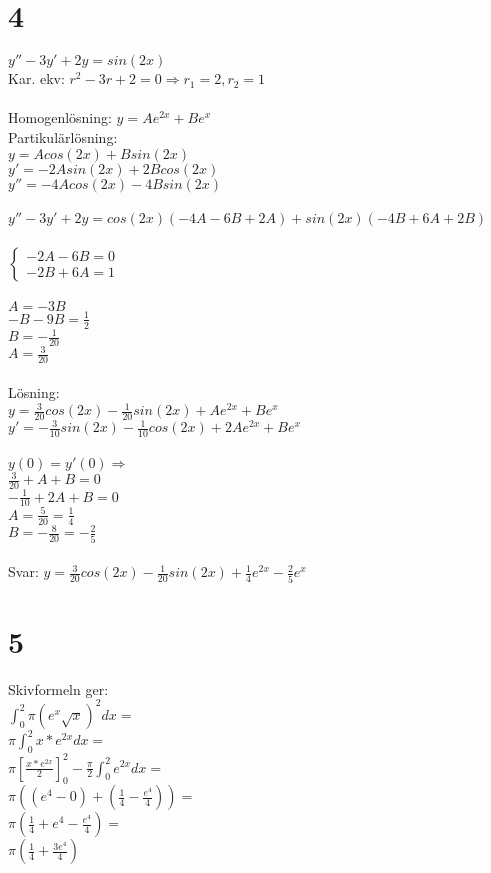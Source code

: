 \documentclass{article}
\begin{document}
\section*{4}
$y''-3y'+2y = sin(2x)$\\
Kar. ekv: $r^2-3r+2=0 \Rightarrow r_1 = 2, r_2 = 1$\\\\
Homogenlösning: $y = Ae^{2x} + Be^x$\\
Partikulärlösning: \\
$y = Acos(2x) + Bsin(2x)$\\
$y' = -2Asin(2x) + 2Bcos(2x)$\\
$y'' = -4Acos(2x) - 4Bsin(2x)$\\\\
$y''-3y'+2y = cos(2x)(-4A - 6B + 2A) + sin(2x)(-4B + 6A + 2B)$\\\\
$\left\{
    \begin{array}{l}
        -2A - 6B = 0\\
        -2B + 6A = 1
    \end{array}\right.$\\\\
$A = -3B$\\
$-B - 9B = \frac{1}{2}$\\
$B = -\frac{1}{20}$\\
$A = \frac{3}{20}$\\\\
Lösning:\\
$y = \frac{3}{20}cos(2x) - \frac{1}{20}sin(2x) + A e^{2x}+Be^x$\\
$y' = -\frac{3}{10}sin(2x) - \frac{1}{10} cos(2x) + 2Ae^{2x} + Be^x$\\\\
$y(0) = y'(0) \Rightarrow$\\
$\frac{3}{20} + A + B = 0$\\
$- \frac{1}{10} + 2A + B = 0$\\
$A = \frac{5}{20} = \frac{1}{4}$\\
$B = - \frac{8}{20} = - \frac{2}{5}$\\\\
Svar: $y=\frac{3}{20}cos(2x)-\frac{1}{20}sin(2x)+\frac{1}{4}e^{2x}-\frac{2}{5}e^x$

\section*{5}
Skivformeln ger:\\
$\int_{0}^{2} \pi (e^x\sqrt{x})^2 dx = $\\
$\pi \int_0^2 x*e^{2x}dx = $\\
$\pi [\frac{x*e^{2x}}{2}]_0^2 - \frac{\pi}{2} \int_0^2 e^{2x}dx = $\\
$\pi((e^4-0) + (\frac{1}{4} - \frac{e^4}{4})) = $\\
$\pi(\frac{1}{4} + e^4 - \frac{e^4}{4}) = $\\
$\pi(\frac{1}{4} + \frac{3e^4}{4})$
\end{document}
